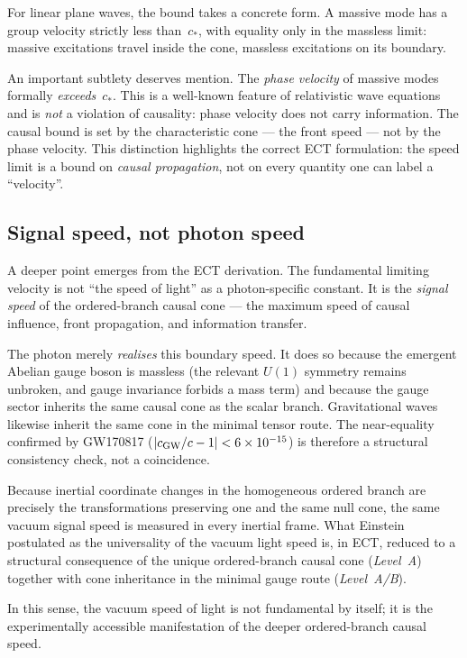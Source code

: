 \documentclass[11pt,a4paper]{article}
\begin{document}
For linear plane waves, the bound takes a concrete form. A massive mode has a group velocity strictly less than~$c_*$, with equality only in the massless limit: massive excitations travel inside the cone, massless excitations on its boundary.

An important subtlety deserves mention. The \emph{phase velocity} of massive modes formally \emph{exceeds}~$c_*$. This is a well-known feature of relativistic wave equations and is \emph{not} a violation of causality: phase velocity does not carry information. The causal bound is set by the characteristic cone --- the front speed --- not by the phase velocity. This distinction highlights the correct ECT formulation: the speed limit is a bound on \emph{causal propagation}, not on every quantity one can label a ``velocity''.

\subsection{Signal speed, not photon speed}

A deeper point emerges from the ECT derivation. The fundamental limiting velocity is not ``the speed of light'' as a photon-specific constant. It is the \emph{signal speed} of the ordered-branch causal cone --- the maximum speed of causal influence, front propagation, and information transfer.

The photon merely \emph{realises} this boundary speed. It does so because the emergent Abelian gauge boson is massless (the relevant $U(1)$ symmetry remains unbroken, and gauge invariance forbids a mass term) and because the gauge sector inherits the same causal cone as the scalar branch. Gravitational waves likewise inherit the same cone in the minimal tensor route. The near-equality confirmed by GW170817 ($|c_{\rm GW}/c - 1| < 6 \times 10^{-15}$) is therefore a structural consistency check, not a coincidence.

Because inertial coordinate changes in the homogeneous ordered branch are precisely the transformations preserving one and the same null cone, the same vacuum signal speed is measured in every inertial frame. What Einstein postulated as the universality of the vacuum light speed is, in ECT, reduced to a structural consequence of the unique ordered-branch causal cone (\emph{Level~A}) together with cone inheritance in the minimal gauge route (\emph{Level~A/B}).

In this sense, the vacuum speed of light is not fundamental by itself; it is the experimentally accessible manifestation of the deeper ordered-branch causal speed.
\end{document}
